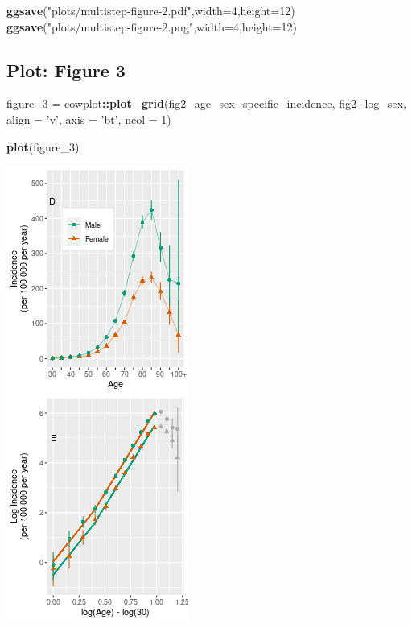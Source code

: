 \documentclass[
]{article}
\newenvironment{Shaded}{\begin{snugshade}}{\end{snugshade}}
\newcommand{\DataTypeTok}[1]{\textcolor[rgb]{0.13,0.29,0.53}{#1}}
\newcommand{\DecValTok}[1]{\textcolor[rgb]{0.00,0.00,0.81}{#1}}
\newcommand{\KeywordTok}[1]{\textcolor[rgb]{0.13,0.29,0.53}{\textbf{#1}}}
\newcommand{\NormalTok}[1]{#1}
\newcommand{\OperatorTok}[1]{\textcolor[rgb]{0.81,0.36,0.00}{\textbf{#1}}}
\newcommand{\StringTok}[1]{\textcolor[rgb]{0.31,0.60,0.02}{#1}}
\begin{document}
\begin{Shaded}
\begin{Highlighting}[]
\KeywordTok{ggsave}\NormalTok{(}\StringTok{"plots/multistep-figure-2.pdf"}\NormalTok{,}\DataTypeTok{width=}\DecValTok{4}\NormalTok{,}\DataTypeTok{height=}\DecValTok{12}\NormalTok{)}
\KeywordTok{ggsave}\NormalTok{(}\StringTok{"plots/multistep-figure-2.png"}\NormalTok{,}\DataTypeTok{width=}\DecValTok{4}\NormalTok{,}\DataTypeTok{height=}\DecValTok{12}\NormalTok{)}
\end{Highlighting}
\end{Shaded}

\hypertarget{plot-figure-3}{%
\subsection{Plot: Figure 3}\label{plot-figure-3}}

\begin{Shaded}
\begin{Highlighting}[]
\NormalTok{figure_}\DecValTok{3}\NormalTok{ =}\StringTok{ }\NormalTok{cowplot}\OperatorTok{::}\KeywordTok{plot_grid}\NormalTok{(fig2_age_sex_specific_incidence,}
\NormalTok{                              fig2_log_sex, }
                              \DataTypeTok{align =} \StringTok{'v'}\NormalTok{,}
                              \DataTypeTok{axis =} \StringTok{'bt'}\NormalTok{, }\DataTypeTok{ncol =} \DecValTok{1}\NormalTok{)}

\KeywordTok{plot}\NormalTok{(figure_}\DecValTok{3}\NormalTok{)}
\end{Highlighting}
\end{Shaded}

\includegraphics{multistep-model-comparison_files/figure-latex/figure3-1.png}
\end{document}

